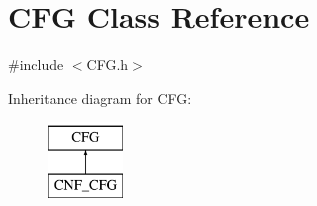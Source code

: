 \hypertarget{classCFG}{\section{C\-F\-G Class Reference}
\label{classCFG}
}


{\ttfamily \#include $<$C\-F\-G.\-h$>$}

Inheritance diagram for C\-F\-G\-:\begin{figure}[H]
\begin{center}
\leavevmode
\includegraphics[height=2.000000cm]{d7/dd4/classCFG}
\end{center}
\end{figure}
